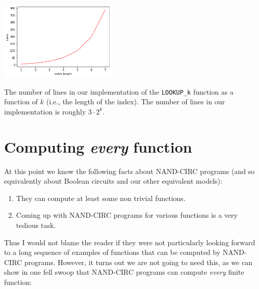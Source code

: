 \begin{marginfigure}
\centering
\includegraphics[width=\linewidth, height=1.5in, keepaspectratio]{../figure/lookup_numlines.png}
\caption{The number of lines in our implementation of the
\texttt{LOOKUP\_k} function as a function of \(k\) (i.e., the length of
the index). The number of lines in our implementation is roughly
\(3 \cdot 2^k\).}
\label{lookuplinesfig}
\end{marginfigure}

\section{Computing \emph{every} function}\label{seccomputeallfunctions}

At this point we know the following facts about NAND-CIRC programs (and
so equivalently about Boolean circuits and our other equivalent models):

\begin{enumerate}
\def\labelenumi{\arabic{enumi}.}
\item
  They can compute at least some non trivial functions.
\item
  Coming up with NAND-CIRC programs for various functions is a very
  tedious task.
\end{enumerate}

Thus I would not blame the reader if they were not particularly looking
forward to a long sequence of examples of functions that can be computed
by NAND-CIRC programs. However, it turns out we are not going to need
this, as we can show in one fell swoop that NAND-CIRC programs can
compute \emph{every} finite function:

\hypertarget{NAND-univ-thm}{}

